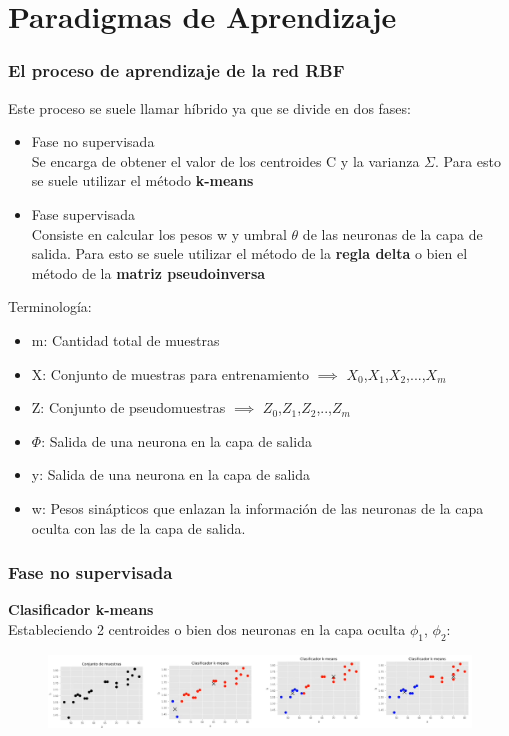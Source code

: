 \documentclass[
	11pt, %
]{beamer}
\begin{document}
\section{Paradigmas de Aprendizaje}
\begin{frame}
  \frametitle{El proceso de aprendizaje de la red RBF}
  Este proceso se suele llamar híbrido ya que se divide en dos fases:\\

  \begin{itemize}
  \item Fase no supervisada\\
    Se encarga de obtener el valor de los centroides C y la varianza $\Sigma$. Para esto se suele utilizar el método \textbf{k-means}
  \item Fase supervisada\\
    Consiste en calcular los pesos w y umbral $\theta$ de las neuronas de la capa de salida. Para esto se suele utilizar el método de la \textbf{regla delta} o bien el método de la \textbf{matriz pseudoinversa}
  \end{itemize}
  \bigskip %
  Terminología:
  \begin{itemize}
  \item m: Cantidad total de muestras
  \item X: Conjunto de muestras para entrenamiento $\implies$ {$X_{0}$,$X_{1}$,$X_{2}$,...,$X_{m}$}
  \item Z: Conjunto de pseudomuestras $\implies$ {$Z_{0}$,$Z_{1}$,$Z_{2}$,..,$Z_{m}$}
  \item $\Phi$: Salida de una neurona en la capa de salida
  \item y: Salida de una neurona en la capa de salida
  \item w: Pesos sinápticos que enlazan la información de las neuronas de la capa oculta con las de la capa de salida.
  \end{itemize}
\end{frame}

\begin{frame}
  \frametitle{Fase no supervisada}

  \textbf{Clasificador k-means}\\
  Estableciendo 2 centroides o bien dos neuronas en la capa oculta $\phi_{1}$, $\phi_{2}$:

  \begin{figure}
    \includegraphics[width=1.0\linewidth]{kmeans.png}
  \end{figure}
  
\end{frame}
\end{document}
